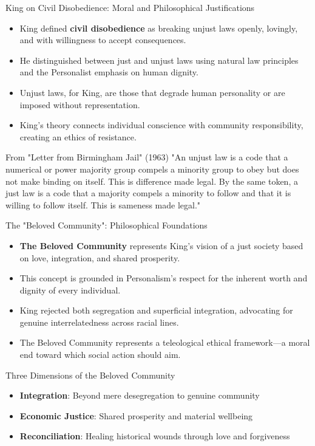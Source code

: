 \documentclass{beamer}
\begin{document}
	\begin{frame}{King on Civil Disobedience: Moral and Philosophical Justifications}
		\begin{itemize}
			\item King defined \textbf{civil disobedience} as breaking unjust laws openly, lovingly, and with willingness to accept consequences.
			\item He distinguished between just and unjust laws using natural law principles and the Personalist emphasis on human dignity.
			\item Unjust laws, for King, are those that degrade human personality or are imposed without representation.
			\item King's theory connects individual conscience with community responsibility, creating an ethics of resistance.
		\end{itemize}
		
		\begin{block}{From "Letter from Birmingham Jail" (1963)}
			"An unjust law is a code that a numerical or power majority group compels a minority group to obey but does not make binding on itself. This is difference made legal. By the same token, a just law is a code that a majority compels a minority to follow and that it is willing to follow itself. This is sameness made legal."
		\end{block}
	\end{frame}
	
	\begin{frame}{The "Beloved Community": Philosophical Foundations}
		\begin{itemize}
			\item \textbf{The Beloved Community} represents King's vision of a just society based on love, integration, and shared prosperity.
			\item This concept is grounded in Personalism's respect for the inherent worth and dignity of every individual.
			\item King rejected both segregation and superficial integration, advocating for genuine interrelatedness across racial lines.
			\item The Beloved Community represents a teleological ethical framework—a moral end toward which social action should aim.
		\end{itemize}
		
		\begin{exampleblock}{Three Dimensions of the Beloved Community}
			\begin{itemize}
				\item \textbf{Integration}: Beyond mere desegregation to genuine community
				\item \textbf{Economic Justice}: Shared prosperity and material wellbeing
				\item \textbf{Reconciliation}: Healing historical wounds through love and forgiveness
			\end{itemize}
		\end{exampleblock}
	\end{frame}
	
\end{document}

